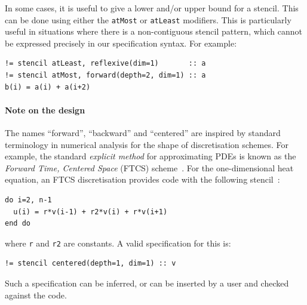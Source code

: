 \documentclass[9pt]{sigplanconf}
\theoremstyle{definition}
\newcommand{\eg}{\emph{e.g.}}
\newcommand{\term}[1]{\texttt{#1}}
\begin{document}
%
%


In some cases, it is useful to give a lower and/or upper bound for a
stencil. This can be done using either the \term{atMost} or
\term{atLeast} modifiers. This is particularly useful in situations
where there is a non-contiguous stencil pattern, which cannot be expressed
precisely in our specification syntax. For example:
\begin{verbatim}
!= stencil atLeast, reflexive(dim=1)       :: a
!= stencil atMost, forward(depth=2, dim=1) :: a
b(i) = a(i) + a(i+2)
\end{verbatim}

\paragraph{Note on the design}

The names ``forward'', ``backward'' and ``centered''
are inspired by standard terminology in numerical analysis
for the shape of discretisation schemes. For example,
the standard \emph{explicit method} for approximating
PDEs is known as the \emph{Forward Time, Centered Space} (FTCS)
scheme~\cite{dawson1991finite}. For
the one-dimensional heat equation, an FTCS discretisation
provides code with the following stencil~\cite{recktenwald2004finite}:
\begin{verbatim}
do i=2, n-1
  u(i) = r*v(i-1) + r2*v(i) + r*v(i+1)
end do
\end{verbatim}
where \texttt{r} and \texttt{r2} are constants.
A valid specification for this is:
\begin{verbatim}
!= stencil centered(depth=1, dim=1) :: v
\end{verbatim}
Such a specification can be inferred, or can be inserted by a user
and checked against the code.
\end{document}
